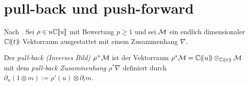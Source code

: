 \section{pull-back und push-forward}

Nach \cite[1.a]{sabbah_Fourier-local}. Sei $\rho\in u{\mathbb C\llbracket u\rrbracket}$ mit Bewertung
$p\geq1$ und sei $\mathcal{M}$ ein endlich dimensionaler $\mathbb{C}(\!(t)\!)$ Vektorraum
ausgestattet mit einem Zusammenhang $\nabla$.
\begin{defn}
  \cite[1.a]{sabbah_Fourier-local}
  Der \emph{pull-back (Inverses Bild)} $\rho^{+}\mathcal{M}$ ist der Vektorraum
  $\rho^{*}\mathcal{M}=\mathbb{C}(\!(u)\!)\otimes_{\mathbb{C}(\!(t)\!)}\mathcal{M}$ mit dem \emph{pull-back
    Zusammenhang} $\rho^*\nabla$ definiert durch $\partial_u(1\otimes
  m):=\rho'(u)\otimes\partial_tm$.
\end{defn}

